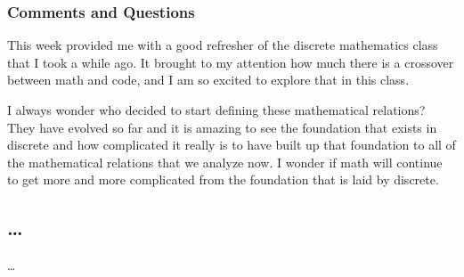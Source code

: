 \documentclass{article}
\theoremstyle{theorem}
\theoremstyle{definition}
\theoremstyle{remark}
\begin{document}
\subsubsection*{Comments and Questions}

This week provided me with a good refresher of the discrete mathematics class that I took a while ago. It brought to my attention how much
there is a crossover between math and code, and I am so excited to explore that in this class.

I always wonder who decided to start defining these mathematical relations? They have evolved so far and it is amazing to see the foundation that exists in discrete and how complicated it really is to have built up that foundation to all of the mathematical relations that we analyze now. I wonder if math will continue to get more and more complicated from the foundation that is laid by discrete.

\subsection{\ldots}

\ldots








\end{document}
